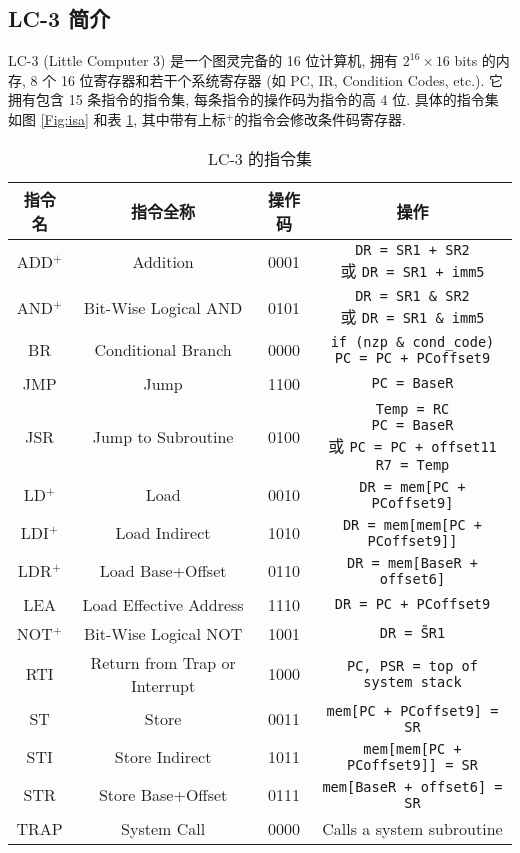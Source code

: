 \documentclass[UTF8,fontset=fandol]{ctexart}
\begin{document}
\subsection*{LC-3 简介}
LC-3 (Little Computer 3) 是一个图灵完备的 16 位计算机, 拥有 $2^{16}\times16$ bits 的内存, 8 个 16 位寄存器和若干个系统寄存器 (如 PC, IR, Condition Codes, etc.). 
它拥有包含 15 条指令的指令集, 每条指令的操作码为指令的高 4 位. 具体的指令集如图 \ref{Fig:isa} 和表 \ref{Tab:isa}, 其中带有上标$^+$的指令会修改条件码寄存器.
\begin{table}[!htbp]
  \centering
  \caption{LC-3 的指令集}
  \label{Tab:isa}
  \begin{tabular}{cccc}
    \toprule 
    指令名 & 指令全称 & 操作码 & 操作 \\
    \midrule
    ADD$^+$ & Addition & 0001 & \makecell{\texttt{DR = SR1 + SR2} \\ 或 \texttt{DR = SR1 + imm5}} \\
    \midrule
    AND$^+$ & Bit-Wise Logical AND & 0101 & \makecell{\texttt{DR = SR1 \& SR2} \\ 或 \texttt{DR = SR1 \& imm5}} \\
    \midrule
    BR  & Conditional Branch & 0000 & \makecell{\texttt{if (nzp \& cond\_code)} \\\texttt{PC = PC + PCoffset9}} \\
    \midrule
    JMP & Jump & 1100 & \texttt{PC = BaseR} \\
    \midrule
    JSR & Jump to Subroutine & 0100 & \makecell{\texttt{Temp = RC}\\\texttt{PC = BaseR} \\或 \texttt{PC = PC + offset11}\\\texttt{R7 = Temp}}  \\
    \midrule
    LD$^+$  & Load & 0010 & \texttt{DR = mem[PC + PCoffset9]} \\
    \midrule
    LDI$^+$ & Load Indirect & 1010 & \texttt{DR = mem[mem[PC + PCoffset9]]} \\
    \midrule
    LDR$^+$ & Load Base+Offset & 0110 & \texttt{DR = mem[BaseR + offset6]} \\
    \midrule
    LEA & Load Effective Address & 1110 & \texttt{DR = PC + PCoffset9} \\
    \midrule
    NOT$^+$ & Bit-Wise Logical NOT & 1001 & \texttt{DR = \~SR1} \\
    \midrule
    RTI & Return from Trap or Interrupt & 1000 & \texttt{PC, PSR = top of system stack} \\
    \midrule
    ST & Store & 0011 & \texttt{mem[PC + PCoffset9] = SR} \\
    \midrule
    STI & Store Indirect & 1011 & \texttt{mem[mem[PC + PCoffset9]] = SR} \\
    \midrule
    STR & Store Base+Offset & 0111 & \texttt{mem[BaseR + offset6] = SR} \\
    \midrule
    TRAP & System Call & 0000 & Calls a system subroutine \\
    \bottomrule
  \end{tabular}
\end{table}
\end{document}
